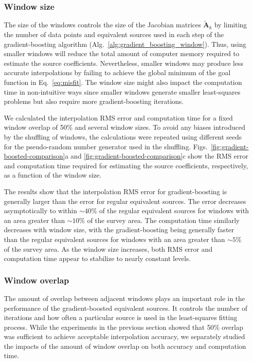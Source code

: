 \documentclass[twocolumn]{article}
\begin{document}
\subsubsection{Window size}
\label{sec:window_size}

The size of the windows controls the size of the Jacobian matrices
$\tilde{\mathbf{A}}_k$ by limiting the number of data points and equivalent
sources used in each step of the gradient-boosting algorithm
(Alg.~\ref{alg:gradient_boosting_window}).
Thus, using smaller windows will reduce the total amount of computer memory
required to estimate the source coefficients.
Nevertheless, smaller windows may produce less accurate interpolations by
failing to achieve the global minimum of the goal function in
Eq.~\ref{eq:misfit}.
The window size might also impact the computation time in non-intuitive ways
since smaller windows generate smaller least-squares problems but also require
more gradient-boosting iterations.

We calculated the interpolation RMS error and computation time for a fixed
window overlap of 50\% and several window sizes.
To avoid any biases introduced by the shuffling of windows, the calculations
were repeated using different seeds for the pseudo-random number generator used
in the shuffling.
Figs.~\ref{fig:gradient-boosted-comparison}a and
\ref{fig:gradient-boosted-comparison}c show the RMS error and computation time
required for estimating the source coefficients, respectively, as a function of
the window size.

The results show that the interpolation RMS error for gradient-boosting is
generally larger than the error for regular equivalent sources.
The error decreases asymptotically to within $\sim 40\%$ of the regular
equivalent sources for windows with an area greater than $\sim 10\%$ of the
survey area.
The computation time similarly decreases with window size, with the
gradient-boosting being generally faster than the regular equivalent sources
for windows with an area greater than $\sim 5\%$ of the survey area.
As the window size increases, both RMS error and computation time appear to
stabilize to nearly constant levels.

\subsubsection{Window overlap}

The amount of overlap between adjacent windows plays an important role in the
performance of the gradient-boosted equivalent sources.
It controls the number of iterations and how often a particular source is used
in the least-squares fitting process.
While the experiments in the previous section showed that 50\% overlap was
sufficient to achieve acceptable interpolation accuracy, we separately studied
the impacts of the amount of window overlap on both accuracy and computation
time.
\end{document}
